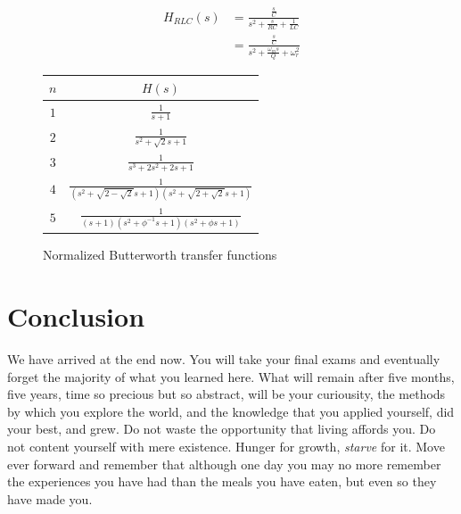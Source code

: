 \documentclass[nobib]{tufte-handout}
\begin{document}
\begin{align}
    H_{RLC}(s) &= \frac{\frac{s}{C}}{s^2 + \frac{s}{RC} + \frac{1}{LC}} \\
    &= \frac{\frac{s}{C}}{s^2 + \frac{\omega_m s}{Q} + \omega^2_r}
\end{align}

\begin{figure}
    \begin{center}
        \begin{tabular}{c | c}
            $n$ & $H(s)$ \\
            \hline
            $1$ & $\frac{1}{s+1}$ \\
            $2$ & $\frac{1}{s^2+\sqrt{2}s + 1}$ \\
            $3$ & $\frac{1}{s^3 + 2s^2 + 2s + 1}$ \\
            $4$ & $\frac{1}{(s^{2}+\sqrt{2-\sqrt{2} } s+1)(s^{2}+\sqrt{2+\sqrt{2} } s+1)}$ \\
            $5$ & $\frac{1}{(s+1)(s^2+\phi^{-1} s+1)(s^2+\phi s+1)}$
        \end{tabular}
    \end{center}
    \caption{Normalized Butterworth transfer functions}
    \label{tab:normalized butterworth}
\end{figure}

\pagebreak

\section{Conclusion}

We have arrived at the end now. 
You will take your final exams 
and eventually forget the 
majority of what you learned
here. What will remain after 
five months, five years, time 
so precious but so abstract, 
will be your curiousity, the 
methods by which you explore the 
world, and the knowledge that 
you applied yourself, did your 
best, and grew. Do not waste 
the opportunity that living 
affords you. Do not content 
yourself with mere existence. 
Hunger for growth, \emph{starve}
for it. Move ever forward
and remember that although 
one day you may no more 
remember the experiences you 
have had than the meals you have 
eaten, but even so they have 
made you.
\end{document}
